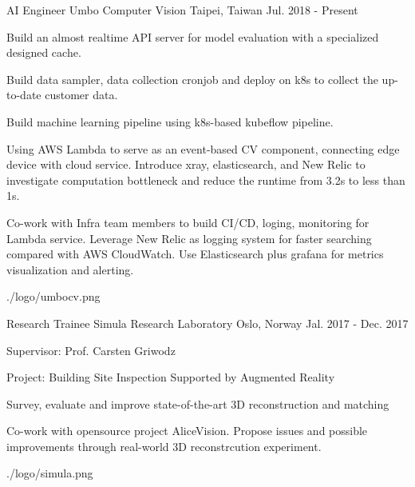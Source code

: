 

\begin{cventries}

  \cventry
    {AI Engineer} %
    {Umbo Computer Vision} %
    {Taipei, Taiwan} %
    {Jul. 2018 - Present} %
    {
      \begin{cvitems} %
        \item {Build an almost realtime API server for model evaluation with a specialized designed cache.}
        \item {Build data sampler, data collection cronjob and deploy on k8s to collect the up-to-date customer data.}
        \item {Build machine learning pipeline using k8s-based kubeflow pipeline.}
        \item {Using AWS Lambda to serve as an event-based CV component, connecting edge device with cloud service. Introduce xray, elasticsearch, and New Relic to investigate computation bottleneck and reduce the runtime from 3.2s to less than 1s.}
        \item {Co-work with Infra team members to build CI/CD, loging, monitoring for Lambda service. Leverage New Relic as logging system for faster searching compared with AWS CloudWatch. Use Elasticsearch plus grafana for metrics visualization and alerting.}
      \end{cvitems}
    }
    {./logo/umbocv.png}

  \cventry
    {Research Trainee} %
    {Simula Research Laboratory} %
    {Oslo, Norway} %
    {Jal. 2017 - Dec. 2017} %
    {
      \begin{cvitems} %
        \item {Supervisor: Prof. Carsten Griwodz}
        \item {Project: Building Site Inspection Supported by Augmented Reality}
        \item {Survey, evaluate and improve state-of-the-art 3D reconstruction and matching}
        \item {Co-work with opensource project AliceVision. Propose issues and possible improvements through real-world 3D reconstrcution experiment.}
      \end{cvitems}
    }
    {./logo/simula.png} %

\end{cventries}

